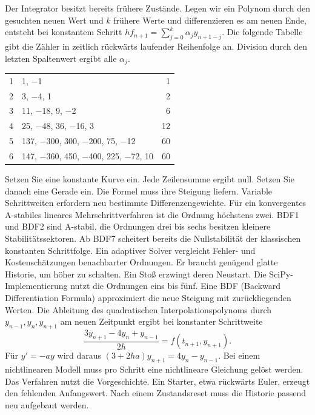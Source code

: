 \hypertarget{punkt3-4-1}{}
Der Integrator besitzt bereits frühere Zustände. Legen wir ein Polynom durch den gesuchten neuen Wert und \(k\) frühere Werte und differenzieren es am neuen Ende, entsteht bei konstantem Schritt \(h f_{n+1}=\sum_{j=0}^k\alpha_j y_{n+1-j}\). Die folgende Tabelle gibt die Zähler in zeitlich rückwärts laufender Reihenfolge an. Division durch den letzten Spaltenwert ergibt alle \(\alpha_j\).
{\tblstart\begin{tabularx}{\linewidth}{@{}rYr@{}}\toprule
{}&&\\&1, \ensuremath{-}1&1\\2&3, \ensuremath{-}4, 1&2\\3&11, \ensuremath{-}18, 9, \ensuremath{-}2&6\\4&25, \ensuremath{-}48, 36, \ensuremath{-}16, 3&12\\5&137, \ensuremath{-}300, 300, \ensuremath{-}200, 75, \ensuremath{-}12&60\\6&147, \ensuremath{-}360, 450, \ensuremath{-}400, 225, \ensuremath{-}72, 10&60\\\bottomrule\end{tabularx}\par}
Setzen Sie eine konstante Kurve ein. Jede Zeilensumme ergibt null. Setzen Sie danach eine Gerade ein. Die Formel muss ihre Steigung liefern. Variable Schrittweiten erfordern neu bestimmte Differenzengewichte.
\hypertarget{punkt3-4-2}{}
Für ein konvergentes A-stabiles lineares Mehrschrittverfahren ist die Ordnung höchstens zwei. BDF1 und BDF2 sind A-stabil, die Ordnungen drei bis sechs besitzen kleinere Stabilitätssektoren. Ab BDF7 scheitert bereits die Nullstabilität der klassischen konstanten Schrittfolge. Ein adaptiver Solver vergleicht Fehler- und Kostenschätzungen benachbarter Ordnungen. Er braucht genügend glatte Historie, um höher zu schalten. Ein Stoß erzwingt deren Neustart. Die SciPy-Implementierung nutzt die Ordnungen eins bis fünf.
Eine BDF (Backward Differentiation Formula) approximiert die neue Steigung mit zurückliegenden Werten. Die Ableitung des quadratischen Interpolationspolynoms durch \(y_{n-1},y_n,y_{n+1}\) am neuen Zeitpunkt ergibt bei konstanter Schrittweite
\[
 \frac{3y_{n+1}-4y_n+y_{n-1}}{2h}=f(t_{n+1},y_{n+1}).
\]
Für \(y'=-ay\) wird daraus \((3+2ha)y_{n+1}=4y_n-y_{n-1}\). Bei einem nichtlinearen Modell muss pro Schritt eine nichtlineare Gleichung gelöst werden. Das Verfahren nutzt die Vorgeschichte. Ein Starter, etwa rückwärts Euler, erzeugt den fehlenden Anfangswert. Nach einem Zustandsreset muss die Historie passend neu aufgebaut werden.

